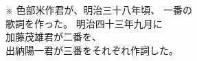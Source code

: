 \documentclass[10pt,b5j]{tarticle} %
\begin{document}
\begin{enumerate}
\begin{minipage}[c]{\blocksize}
    \end{minipage}
    \begin{minipage}[c]{\blocksize}
        \setlength{\itemindent}{0em} %

        \item[※]
        色部米作君が、明治三十八年頃、 一番の\\
        歌詞を作った。 明治四十三年九月に\\
        加藤茂雄君が二番を、\\
        出納陽一君が三番をそれぞれ作詞した。

    \end{minipage}
\end{enumerate} %
% 
% 
\end{document}
